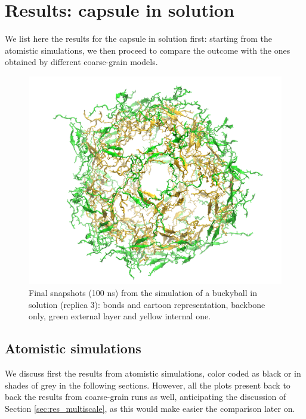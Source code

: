 \section{Results: capsule in solution} \label{sec:results_cap}
We list here the results for the capsule in solution first: starting from the atomistic simulations, we then proceed to compare the outcome with the ones obtained by different coarse-grain models.

\begin{figure}[t]
\centering
\includegraphics[width=0.5\linewidth]{3results_capsule/pics/staR3_render}
\caption[Atomistic run of buckyball in solution: final configuration]{Final snapshots (100 ns) from the simulation of a buckyball in solution (replica 3): bonds and cartoon representation, backbone only, green external layer and yellow internal one.}
\label{fig:BTI_snap}
\end{figure}

\subsection{Atomistic simulations}

We discuss first the results from atomistic simulations, color coded as black or in shades of grey in the following sections. However, all the plots present back to back the results from coarse-grain runs as well, anticipating the discussion of Section \ref{sec:res_multiscale}, as this would make easier the comparison later on.

